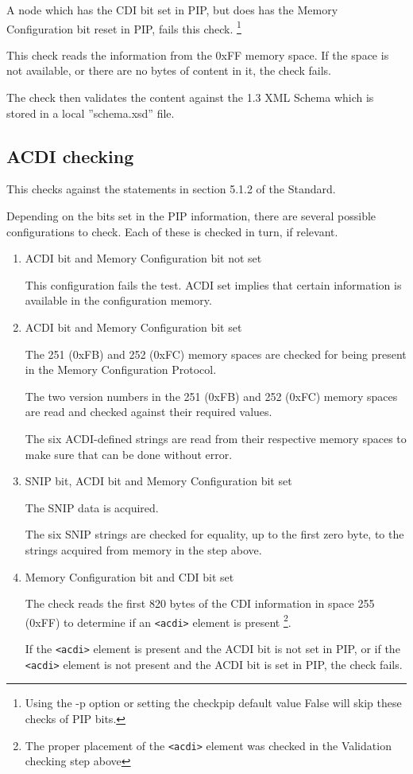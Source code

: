 \documentclass[11pt]{article}
\newcommand*{\xml}[1]{\texttt{<#1>}}
\begin{document}
A node which has the CDI bit set in PIP, but does
has the Memory Configuration bit reset in PIP, fails this check.
\footnote{Using the -p option or setting the checkpip default value False will 
skip these checks of PIP bits.}

This check reads the information from the 0xFF memory space.
If the space is not available, or there are no bytes of content in it, the check fails.
 
The check then validates the content against the 1.3 XML Schema
which is stored in a local ”schema.xsd” file.

\subsection{ACDI checking}

This checks against the statements in section 5.1.2 of the Standard.

Depending on the bits set in the PIP information, there are several 
possible configurations to check. Each of these is checked in turn, if relevant.

\begin{enumerate}

\item ACDI bit and Memory Configuration bit not set

This configuration fails the test.  ACDI set implies that certain information 
is available in the configuration memory.

\item ACDI bit and Memory Configuration bit set

The 251 (0xFB) and 252 (0xFC) memory spaces are checked for
being present in the Memory Configuration Protocol.

The two version numbers in the 251 (0xFB) and 252 (0xFC) memory spaces
are read and checked against their required values.

The six ACDI-defined strings are read from their respective memory spaces
to make sure that can be done without error.

\item SNIP bit, ACDI bit and Memory Configuration bit set

The SNIP data is acquired.
 
The six SNIP strings are checked for equality, up to the first zero byte, to the
strings acquired from memory in the step above.

\item Memory Configuration bit and CDI bit set

The check reads the first 820 bytes of the CDI information in space 255 (0xFF) to 
determine if an \xml{acdi} element is present
\footnote{The proper placement of the \xml{acdi} element was checked in the Validation 
checking step above}.  

If the \xml{acdi} element is present and the ACDI bit is not set in PIP, or
if the \xml{acdi} element is not present and the ACDI bit is set in PIP,
the check fails.

\end{enumerate}
\end{document}
